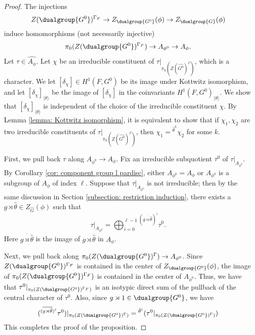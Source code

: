 \documentclass[11pt,letterpaper]{amsart}
\numberwithin{equation}{section}
\begin{document}
\begin{proof}


The injections
\[ Z(\dualgroup{G^0})^{\Gamma_F} \to Z_{\dualgroup{G^0}}(\phi) \to Z_{\dualgroup{G}}(\phi) \]
induce homomorphisms (not necessarily injective)
\[ \pi_0(Z(\dualgroup{G^0})^{\Gamma_F})  \to A_{\phi^0} \to  A_{\phi}. \]
Let $\tau \in \widehat{A_{\phi}}$. Let $\chi$ be an irreducible constituent of $\tau|_{\pi_0(Z(\widehat{G^0})^{\Gamma})}$, which is a character. We let $[\delta_{\chi}] \in H^1(F,G^0)$ be its image under Kottwitz isomorphism, and let $[\delta_{\chi}]_{\langle \theta \rangle}$ be the image of $[\delta_{\chi}]$ in the coinvariants $H^1(F,G^0)_{\langle \theta \rangle}$. We show that $[\delta_{\chi}]_{\langle \theta\rangle}$ is independent of the choice of the irreducible constituent $\chi$. By Lemma \ref{lemma: Kottwitz isomorphism}, it is equivalent to show that if $\chi_1, \chi_2$ are two irreducible constituents of $\tau|_{\pi_0(Z(\widehat{G^0})^{\Gamma})}$, then $\chi_1= {}^{\hat{\theta}^k}\chi_2$ for some $k$.


First, we pull back $\tau$ along $ A_{\phi^0} \to A_{\phi}$. Fix an irreducible subquotient $\tau^0$ of $\tau|_{A_{\phi^0}}$.
By Corollary \ref{cor: component group  l pardisc}, either $A_{\phi^0}=A_{\phi}$ or $A_{\phi^0}$ is a subgroup of $A_{\phi}$ of index $\ell$. Suppose that $\tau|_{A_{\phi^0}}$ is not irreducible; then by the same discussion in Section \ref{subsection: restriction induction}, there exists a $g \rtimes \hat{\theta} \in Z_{\widehat{G}}(\phi)$ such that
\[ \tau|_{A_{\phi^0}}= \bigoplus_{i=0}^{\ell-1} {}^{(\overline{g \rtimes \hat{\theta}})^i}\tau^0.\]
Here $\overline{g \rtimes \hat{\theta}}$ is the image of $g \rtimes \hat{\theta}$ in $A_{\phi}$.


Next, we pull back along $\pi_0(Z(\dualgroup{G^0})^{\Gamma}) \to A_{\phi^0}$.
Since $Z(\dualgroup{G^0})^{\Gamma_F}$ is contained in the center of $Z_{\dualgroup{G^0}}(\phi)$, the image of $\pi_0(Z(\dualgroup{G^0})^{\Gamma_F})$ is contained in the center of $A_{\phi^0}$. Thus, we have that $\tau^0|_{\pi_0(Z(\dualgroup{G^0})^{\Gamma_F})}$ is an isotypic direct sum of the pullback of the central character of $\tau^0$. Also, since $g \rtimes 1 \in \dualgroup{G^0}$, we have 
\begin{align*}
  (  {}^{(\overline{g \rtimes \hat{\theta}})^i}\tau^0)|_{\pi_0(Z(\dualgroup{G^0})^{\Gamma})}= {}^{\hat{\theta}^i}(\tau^0|_{\pi_0(Z(\dualgroup{G^0})^{\Gamma})})
\end{align*}
This completes the proof of the proposition.
\end{proof}
\end{document}

